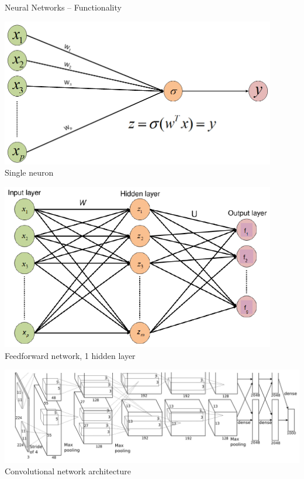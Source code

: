 \begin{frame}{Neural Networks -- Functionality}
\begin{minipage}[b]{0.24\textwidth}
  \includegraphics[width=0.9\textwidth]{figure/nn-single-neuron} \\
  \tiny{Single neuron}
\end{minipage}%
\begin{minipage}[b]{0.24\textwidth}
  \includegraphics[width=0.9\textwidth]{figure/nn-feedforward} \\
  \tiny{Feedforward network, 1 hidden layer}
\end{minipage}%
\begin{minipage}[b]{0.5\textwidth}
  \includegraphics[width=\textwidth]{figure/nn-cnn-1} \\
  \tiny{Convolutional network architecture}
\end{minipage}

\end{frame}

